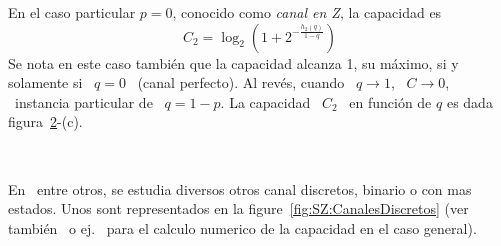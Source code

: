 En el  caso particular $p  = 0$,  conocido como {\it  canal en Z},  la capacidad
es
%
\[
C_2 = \log_2\left( 1 +  2^{- \frac{h_2(q)}{1-q}} \right)
\]
%
Se nota  en este caso tambi\'en  que la capacidad  alcanza 1, su m\'aximo,  si y
solamente si \ $q = 0$ \ (canal perfecto).  Al rev\'es, cuando \ $q \to 1$, \ $C
\to  0$, \ instancia  particular de  \ $q  = 1-p$.   La capacidad  \ $C_2$  \ en
funci\'on de $q$ es dada figura~\ref{fig:SZ:CCanalBinario}-(c).


\begin{figure}[h!]
%
\begin{center}  \end{center}
%
%
\label{fig:SZ:ICanalBinario}
\end{figure}

\

\begin{figure}[h!]
%
\begin{center}  \end{center}
%
%
\label{fig:SZ:CCanalBinario}
\end{figure}

En~\cite{CovTho06,  Rio07}   entre  otros,  se  estudia   diversos  otros  canal
discretos,  binario  o   con  mas  estados.   Unos  sont   representados  en  la
figure~\ref{fig:SZ:CanalesDiscretos}   (ver   tambi\'en~\cite{Sha48,
  Eli57} o ej.~\cite{Ari72} para el calculo  numerico de la capacidad en el caso
general).


